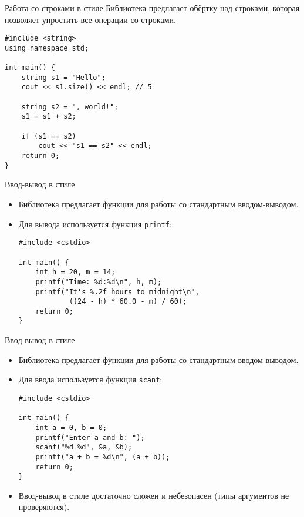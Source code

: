 \documentclass{beamer}
\begin{document}
\begin{frame}[fragile]{Работа со строками в стиле \langcpp}
        Библиотека  предлагает обёртку
            над строками, которая позволяет упростить все
            операции со строками.

\small
\begin{lstlisting}
#include <string>
using namespace std;

int main() {
    string s1 = "Hello";
    cout << s1.size() << endl; // 5

    string s2 = ", world!";
    s1 = s1 + s2;
                               
    if (s1 == s2)
        cout << "s1 == s2" << endl;
    return 0;
}
\end{lstlisting}
\end{frame}

\begin{frame}[fragile]{Ввод-вывод в стиле \langc}
    \begin{itemize}
        \item Библиотека  предлагает функции
            для работы со стандартным вводом-выводом.

        \item Для вывода используется функция {\tt printf}:
\begin{lstlisting}
#include <cstdio>

int main() {
    int h = 20, m = 14;
    printf("Time: %d:%d\n", h, m);
    printf("It's %.2f hours to midnight\n", 
            ((24 - h) * 60.0 - m) / 60);
    return 0;
}
\end{lstlisting}
    \end{itemize}
\end{frame}

\begin{frame}[fragile]{Ввод-вывод в стиле \langc}
    \begin{itemize}
        \item Библиотека  предлагает функции
            для работы со стандартным вводом-выводом.

        \item Для ввода используется функция {\tt scanf}:
\begin{lstlisting}
#include <cstdio>

int main() {
    int a = 0, b = 0;
    printf("Enter a and b: ");
    scanf("%d %d", &a, &b);
    printf("a + b = %d\n", (a + b));
    return 0;
}
\end{lstlisting}
    \item Ввод-вывод в стиле \langc{} достаточно сложен и
        небезопасен (типы аргументов не проверяются).
    \end{itemize}
\end{frame}
\end{document}

